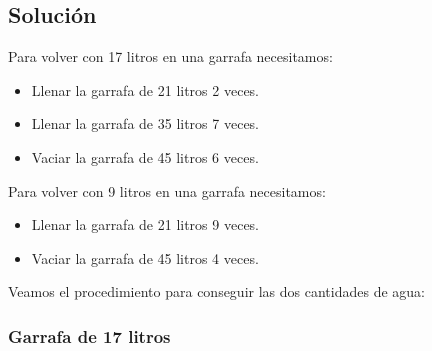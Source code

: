 \subsection*{Solución}

Para volver con 17 litros en una garrafa necesitamos:

\begin{itemize}
	\item
		Llenar la garrafa de 21 litros 2 veces.
	\item
		Llenar la garrafa de 35 litros 7 veces.
	\item
		Vaciar la garrafa de 45 litros 6 veces.
\end{itemize}

Para volver con 9 litros en una garrafa necesitamos:

\begin{itemize}
	\item
		Llenar la garrafa de 21 litros 9 veces.
	\item
		Vaciar la garrafa de 45 litros 4 veces.
\end{itemize}

Veamos el procedimiento para conseguir las dos cantidades de agua:

\subsubsection*{Garrafa de 17 litros}

